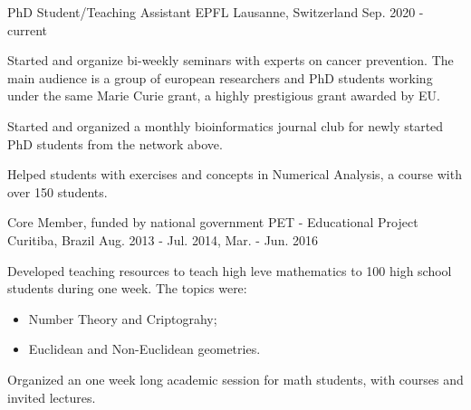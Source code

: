 

\begin{cventries}
  \cventry
    {PhD Student/Teaching Assistant} %
    {EPFL} %
    {Lausanne, Switzerland} %
    {Sep. 2020 - current} %
    {
      \begin{cvitems} %
          \item Started and organize bi-weekly seminars with experts on cancer
                prevention. The main audience is a group of european 
                researchers and PhD students working under the same Marie Curie
                grant, a highly prestigious grant awarded by EU.  
          \item Started and organized a monthly bioinformatics journal club for
                newly started PhD students from the network above.
          \item Helped students with exercises and concepts in 
                Numerical Analysis, a course with over 150 students.
      \end{cvitems}
    }

  \cventry
    {Core Member, funded by national government} %
    {PET - Educational Project} %
    {Curitiba, Brazil} %
    {Aug. 2013 - Jul. 2014, Mar. - Jun. 2016} %
    {
      \begin{cvitems} %
        \item {Developed teaching resources to teach high leve mathematics
        to 100 high school students during one week. The topics were:
        \begin{itemize}
          \item Number Theory and Criptograhy;
          \item Euclidean and Non-Euclidean geometries.
        \end{itemize}}
        \item {Organized an one week long academic session for math students,
        with courses and invited lectures.}
      \end{cvitems}
    }


\end{cventries}
